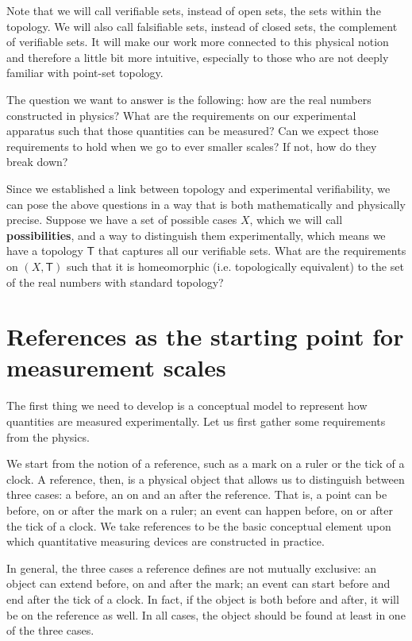 \documentclass[12pt]{iopart}
\begin{document}
Note that we will call verifiable sets, instead of open sets, the sets within the topology. We will also call falsifiable sets, instead of closed sets, the complement of verifiable sets. It will make our work more connected to this physical notion and therefore a little bit more intuitive, especially to those who are not deeply familiar with point-set topology.

The question we want to answer is the following: how are the real numbers constructed in physics? What are the requirements on our experimental apparatus such that those quantities can be measured? Can we expect those requirements to hold when we go to ever smaller scales? If not, how do they break down?

Since we established a link between topology and experimental verifiability, we can pose the above questions in a way that is both mathematically and physically precise. Suppose we have a set of possible cases $X$, which we will call \textbf{possibilities}, and a way to distinguish them experimentally, which means we have a topology $\mathsf{T}$ that captures all our verifiable sets. What are the requirements on $(X, \mathsf{T})$ such that it is homeomorphic (i.e. topologically equivalent) to the set of the real numbers with standard topology?

\section{References as the starting point for measurement scales}

The first thing we need to develop is a conceptual model to represent how quantities are measured experimentally. Let us first gather some requirements from the physics.

We start from the notion of a reference, such as a mark on a ruler or the tick of a clock. A reference, then, is a physical object that allows us to distinguish between three cases: a before, an on and an after the reference. That is, a point can be before, on or after the mark on a ruler; an event can happen before, on or after the tick of a clock. We take references to be the basic conceptual element upon which quantitative measuring devices are constructed in practice.

In general, the three cases a reference defines are not mutually exclusive: an object can extend before, on and after the mark; an event can start before and end after the tick of a clock. In fact, if the object is both before and after, it will be on the reference as well. In all cases, the object should be found at least in one of the three cases.
\end{document}
